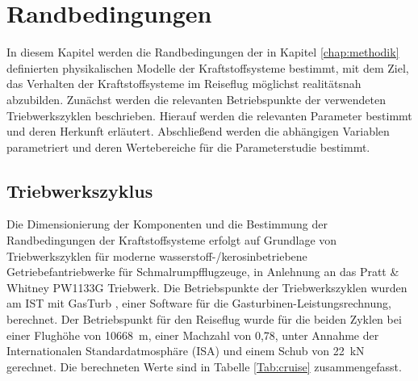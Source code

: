 \chapter{Randbedingungen}
\label{chap:param}

In diesem Kapitel werden die Randbedingungen der in Kapitel \ref{chap:methodik} definierten physikalischen Modelle der Kraftstoffsysteme bestimmt, mit dem Ziel, das Verhalten der Kraftstoffsysteme im Reiseflug möglichst realitätsnah abzubilden. Zunächst werden die relevanten Betriebspunkte der verwendeten Triebwerkszyklen beschrieben. Hierauf werden die relevanten Parameter bestimmt und deren Herkunft erläutert. Abschließend werden die abhängigen Variablen parametriert und deren Wertebereiche für die Parameterstudie bestimmt.

\section{Triebwerkszyklus}

Die Dimensionierung der Komponenten und die Bestimmung der Randbedingungen der Kraftstoffsysteme erfolgt auf Grundlage von Triebwerkszyklen für moderne wasserstoff-/kerosinbetriebene Getriebefantriebwerke für Schmalrumpfflugzeuge, in Anlehnung an das Pratt \& Whitney PW1133G Triebwerk. Die Betriebspunkte der Triebwerkszyklen wurden am IST mit GasTurb \cite{GasTurbGmbH.2021}, einer Software für die Gasturbinen-Leistungsrechnung, berechnet. Der Betriebspunkt für den Reiseflug wurde für die beiden Zyklen bei einer Flughöhe von \SI{10668}{\m}, einer Machzahl von 0,78, unter Annahme der Internationalen Standardatmosphäre (ISA) und einem Schub von \SI{22}{\kilo\N} gerechnet. Die berechneten Werte sind in Tabelle \ref{Tab:cruise} zusammengefasst.

